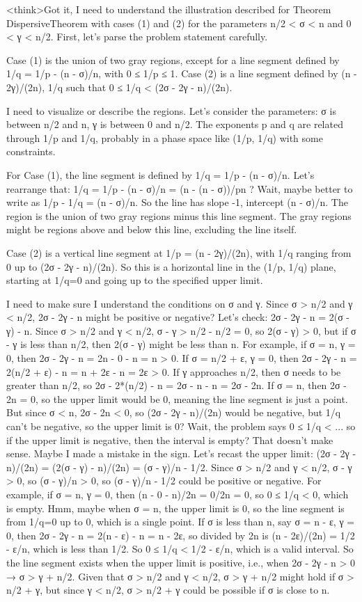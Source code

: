 <think>Got it, I need to understand the illustration described for Theorem {DispersiveTheorem} with cases (1) and (2) for the parameters n/2 < σ < n and 0 < γ < n/2. First, let's parse the problem statement carefully.

Case (1) is the union of two gray regions, except for a line segment defined by 1/q = 1/p - (n - σ)/n, with 0 ≤ 1/p ≤ 1. Case (2) is a line segment defined by (n - 2γ)/(2n), 1/q such that 0 ≤ 1/q < (2σ - 2γ - n)/(2n). 

I need to visualize or describe the regions. Let's consider the parameters: σ is between n/2 and n, γ is between 0 and n/2. The exponents p and q are related through 1/p and 1/q, probably in a phase space like (1/p, 1/q) with some constraints. 

For Case (1), the line segment is defined by 1/q = 1/p - (n - σ)/n. Let's rearrange that: 1/q = 1/p - (n - σ)/n = (n - (n - σ))/pn ? Wait, maybe better to write as 1/p - 1/q = (n - σ)/n. So the line has slope -1, intercept (n - σ)/n. The region is the union of two gray regions minus this line segment. The gray regions might be regions above and below this line, excluding the line itself. 

Case (2) is a vertical line segment at 1/p = (n - 2γ)/(2n), with 1/q ranging from 0 up to (2σ - 2γ - n)/(2n). So this is a horizontal line in the (1/p, 1/q) plane, starting at 1/q=0 and going up to the specified upper limit. 

I need to make sure I understand the conditions on σ and γ. Since σ > n/2 and γ < n/2, 2σ - 2γ - n might be positive or negative? Let's check: 2σ - 2γ - n = 2(σ - γ) - n. Since σ > n/2 and γ < n/2, σ - γ > n/2 - n/2 = 0, so 2(σ - γ) > 0, but if σ - γ is less than n/2, then 2(σ - γ) might be less than n. For example, if σ = n, γ = 0, then 2σ - 2γ - n = 2n - 0 - n = n > 0. If σ = n/2 + ε, γ = 0, then 2σ - 2γ - n = 2(n/2 + ε) - n = n + 2ε - n = 2ε > 0. If γ approaches n/2, then σ needs to be greater than n/2, so 2σ - 2*(n/2) - n = 2σ - n - n = 2σ - 2n. If σ = n, then 2σ - 2n = 0, so the upper limit would be 0, meaning the line segment is just a point. But since σ < n, 2σ - 2n < 0, so (2σ - 2γ - n)/(2n) would be negative, but 1/q can't be negative, so the upper limit is 0? Wait, the problem says 0 ≤ 1/q < ... so if the upper limit is negative, then the interval is empty? That doesn't make sense. Maybe I made a mistake in the sign. Let's recast the upper limit: (2σ - 2γ - n)/(2n) = (2(σ - γ) - n)/(2n) = (σ - γ)/n - 1/2. Since σ > n/2 and γ < n/2, σ - γ > 0, so (σ - γ)/n > 0, so (σ - γ)/n - 1/2 could be positive or negative. For example, if σ = n, γ = 0, then (n - 0 - n)/2n = 0/2n = 0, so 0 ≤ 1/q < 0, which is empty. Hmm, maybe when σ = n, the upper limit is 0, so the line segment is from 1/q=0 up to 0, which is a single point. If σ is less than n, say σ = n - ε, γ = 0, then 2σ - 2γ - n = 2(n - ε) - n = n - 2ε, so divided by 2n is (n - 2ε)/(2n) = 1/2 - ε/n, which is less than 1/2. So 0 ≤ 1/q < 1/2 - ε/n, which is a valid interval. So the line segment exists when the upper limit is positive, i.e., when 2σ - 2γ - n > 0 → σ > γ + n/2. Given that σ > n/2 and γ < n/2, σ > γ + n/2 might hold if σ > n/2 + γ, but since γ < n/2, σ > n/2 + γ could be possible if σ is close to n. 

